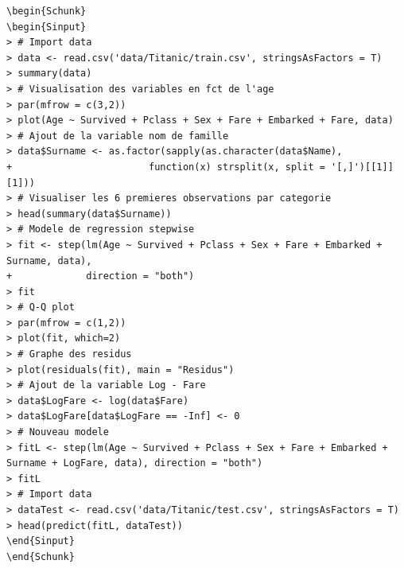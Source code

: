 \documentclass[11pt,french]{report}
\begin{document}
\bigskip
\begin{lstlisting}[linerange=\\begin\{Sinput\}-\\end\{Sinput\},includerangemarker=false, caption = Code source en R pour l'exemple]
\begin{Schunk}
\begin{Sinput}
> # Import data
> data <- read.csv('data/Titanic/train.csv', stringsAsFactors = T)
> summary(data)
> # Visualisation des variables en fct de l'age
> par(mfrow = c(3,2))
> plot(Age ~ Survived + Pclass + Sex + Fare + Embarked + Fare, data)
> # Ajout de la variable nom de famille
> data$Surname <- as.factor(sapply(as.character(data$Name),  
+                        function(x) strsplit(x, split = '[,]')[[1]][1]))
> # Visualiser les 6 premieres observations par categorie
> head(summary(data$Surname))
> # Modele de regression stepwise
> fit <- step(lm(Age ~ Survived + Pclass + Sex + Fare + Embarked + Surname, data), 
+             direction = "both")
> fit
> # Q-Q plot 
> par(mfrow = c(1,2))
> plot(fit, which=2)
> # Graphe des residus
> plot(residuals(fit), main = "Residus")
> # Ajout de la variable Log - Fare
> data$LogFare <- log(data$Fare)
> data$LogFare[data$LogFare == -Inf] <- 0
> # Nouveau modele
> fitL <- step(lm(Age ~ Survived + Pclass + Sex + Fare + Embarked + Surname + LogFare, data), direction = "both")
> fitL
> # Import data
> dataTest <- read.csv('data/Titanic/test.csv', stringsAsFactors = T)
> head(predict(fitL, dataTest))
\end{Sinput}
\end{Schunk}
\end{lstlisting}
\end{document}

